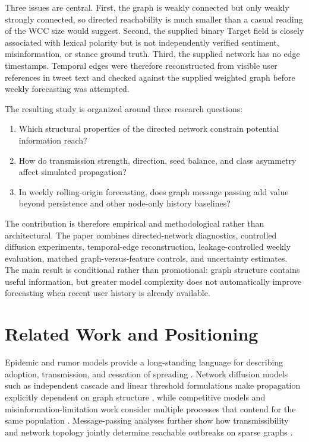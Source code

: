 \documentclass[11pt,a4paper]{article}
\begin{document}
Three issues are central. First, the graph is weakly connected but only weakly strongly connected, so directed reachability is much smaller than a casual reading of the WCC size would suggest. Second, the supplied binary Target field is closely associated with lexical polarity but is not independently verified sentiment, misinformation, or stance ground truth. Third, the supplied network has no edge timestamps. Temporal edges were therefore reconstructed from visible user references in tweet text and checked against the supplied weighted graph before weekly forecasting was attempted.

The resulting study is organized around three research questions:
\begin{enumerate}[label=\textbf{RQ\arabic*:},leftmargin=16mm]
\item Which structural properties of the directed network constrain potential information reach?
\item How do transmission strength, direction, seed balance, and class asymmetry affect simulated propagation?
\item In weekly rolling-origin forecasting, does graph message passing add value beyond persistence and other node-only history baselines?
\end{enumerate}

The contribution is therefore empirical and methodological rather than architectural. The paper combines directed-network diagnostics, controlled diffusion experiments, temporal-edge reconstruction, leakage-controlled weekly evaluation, matched graph-versus-feature controls, and uncertainty estimates. The main result is conditional rather than promotional: graph structure contains useful information, but greater model complexity does not automatically improve forecasting when recent user history is already available.

\section{Related Work and Positioning}
Epidemic and rumor models provide a long-standing language for describing adoption, transmission, and cessation of spreading \citep{kermack1927,daley1964}. Network diffusion models such as independent cascade and linear threshold formulations make propagation explicitly dependent on graph structure \citep{kempe2003}, while competitive models and misinformation-limitation work consider multiple processes that contend for the same population \citep{shir2016,budak2011,lu2024}. Message-passing analyses further show how transmissibility and network topology jointly determine reachable outbreaks on sparse graphs \citep{karrer2010}.
\end{document}
